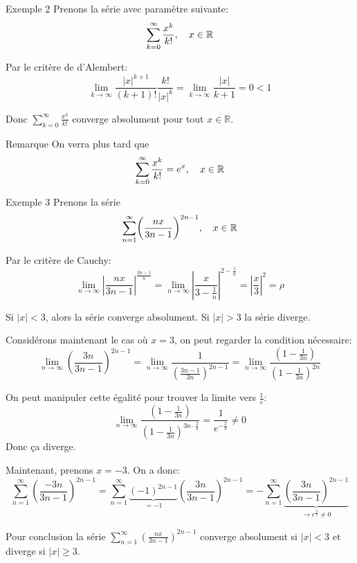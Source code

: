\documentclass[a4paper]{article}
\begin{document}
\begin{parag}{Exemple 2}
    Prenons la série avec paramètre suivante:
    \[\sum_{k=0}^{\infty} \frac{x^{k}}{k!}, \quad x \in \mathbb{R}\]

    Par le critère de d'Alembert:
    \[\lim_{k \to \infty} \frac{\left|x\right|^{k+1}}{\left(k+1\right)!} \frac{k!}{\left|x\right|^{k}} = \lim_{k \to \infty} \frac{\left|x\right|}{k+1} = 0 < 1\]

    Donc $\sum_{k=0}^{\infty} \frac{x^{k}}{k!}$ converge absolument pour tout $x \in \mathbb{R}$.

    \begin{subparag}{Remarque}
        On verra plus tard que
        \[\sum_{k=0}^{\infty} \frac{x^{k}}{k!} = e^x, \quad x \in \mathbb{R}\]
    \end{subparag}
\end{parag}

\begin{parag}{Exemple 3}
    Prenons la série
    \[\sum_{n = 1}^{\infty} \left(\frac{nx}{3n - 1}\right)^{2n - 1}, \mathspace x \in \mathbb{R}\]

    Par le critère de Cauchy:
    \[\lim_{n \to \infty} \left|\frac{nx}{3n - 1}\right|^{\frac{2n - 1}{n}} = \lim_{n \to \infty} \left|\frac{x}{3 - \frac{1}{n}}\right|^{2 - \frac{1}{n}} = \left|\frac{x}{3}\right|^2 = \rho\]

    Si $\left|x\right| < 3$, alors la série converge absolument. Si $\left|x\right|> 3$ la série diverge.

    Considérons maintenant le cas où $x = 3$, on peut regarder la condition nécessaire:
    \[\lim_{n \to \infty} \left(\frac{3n}{3n - 1}\right)^{2n - 1} = \lim_{n \to \infty} \frac{1}{\left(\frac{3n - 1}{3n}\right)^{2n - 1}} = \lim_{n \to \infty} \frac{\left(1 - \frac{1}{3n}\right)}{\left(1 - \frac{1}{3n}\right)^{2n}}\]

    On peut manipuler cette égalité pour trouver la limite vers $\frac{1}{e}$:
    \[\lim_{n \to \infty} \frac{\left(1 - \frac{1}{3n}\right)}{\left(1 - \frac{1}{3n}\right)^{3n \cdot \frac{2}{3}}} = \frac{1}{e^{-\frac{2}{3}}} \neq 0\]
    Donc ça diverge.


    Maintenant, prenons $x = -3$. On a donc:
    \[\sum_{n = 1}^{\infty} \left(\frac{-3n}{3n -1}\right)^{2n - 1} = \sum_{n = 1}^{\infty} \underbrace{\left(-1\right)^{2n - 1}}_{= -1} \left(\frac{3n}{3n-1}\right)^{2n - 1} = -\sum_{n = 1}^{\infty} \underbrace{\left(\frac{3n}{3n - 1}\right)^{2n - 1}}_{\to e^{\frac{2}{3}} \neq 0}\]



    Pour conclusion la série $\sum_{n = 1}^{\infty} \left(\frac{nx}{3n - 1}\right)^{2n - 1}$ converge absolument si $\left|x\right| < 3$ et diverge si $\left|x\right| \geq 3$.

\end{parag}
\end{document}
